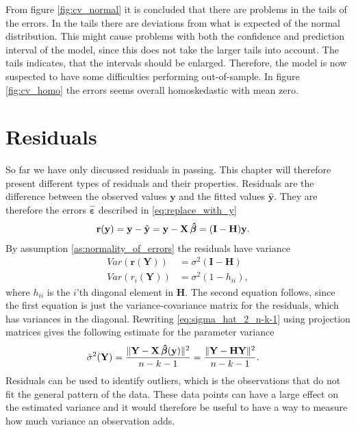 From figure \ref{fig:cv_normal} it is concluded that there are problems in the tails of the errors. 
In the tails there are deviations from what is expected of the normal distribution. 
This might cause problems with both the confidence and prediction interval of the model, since this does not take the larger tails into account.
The tails indicates, that the intervals should be enlarged.
Therefore, the model is now suspected to have some difficulties performing out-of-sample. 
In figure \ref{fig:cv_homo} the errors seems overall homoskedastic with mean zero. 

\section{Residuals}\label{subsec:residuals}
So far we have only discussed residuals in passing. 
This chapter will therefore present different types of residuals and their properties.
Residuals are the difference between the observed values $\textbf{y}$ and the fitted values $\hat{\textbf{y}}$. They are therefore the errors $\boldsymbol{\hat{\varepsilon}}$ described in \eqref{eq:replace_with_y}
\begin{align*}
    \textbf{r}(\textbf{y}) &= \textbf{y} - \hat{\textbf{y}} = \textbf{y} - \textbf{X} \operatorname{\boldsymbol{\hat{\beta}}} = (\textbf{I} - \textbf{H}) \textbf{y}.
\end{align*}
By assumption \ref{as:normality_of_errors} the residuals have variance
\begin{align*}
    Var(\textbf{r}(\textbf{Y})) &= \sigma^2 (\textbf{I} - \textbf{H}) \\
    Var(r_i(\textbf{Y})) &= \sigma^2(1 - h_{ii}),
\end{align*}
where $h_{ii}$ is the $i$'th diagonal element in $\textbf{H}$. The second equation follows, since the first equation is just the variance-covariance matrix for the residuals, which has variances in the diagonal.
Rewriting \eqref{eq:sigma_hat_2_n-k-1} using projection matrices gives the following estimate for the parameter variance
\begin{align*}
    \hat{\sigma}^2(\textbf{Y}) &= \frac{\| \textbf{Y} - \textbf{X} \operatorname{\boldsymbol{\hat{\beta}}} (\textbf{y}) \|^2 }{n-k-1} = \frac{\| \textbf{Y} - \textbf{H} \textbf{Y} \|^2}{n-k-1} .
\end{align*}
Residuals can be used to identify outliers, which is the observations that do not fit the general pattern of the data.
These data points can have a large effect on the estimated variance and it would therefore be useful to have a way to measure how much variance an observation adds.
